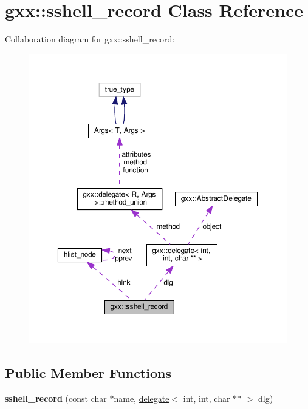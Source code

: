 \hypertarget{classgxx_1_1sshell__record}{}\section{gxx\+:\+:sshell\+\_\+record Class Reference}
\label{classgxx_1_1sshell__record}


Collaboration diagram for gxx\+:\+:sshell\+\_\+record\+:
\nopagebreak
\begin{figure}[H]
\begin{center}
\leavevmode
\includegraphics[width=350pt]{classgxx_1_1sshell__record__coll__graph}
\end{center}
\end{figure}
\subsection*{Public Member Functions}
\begin{DoxyCompactItemize}
\item 
{\bfseries sshell\+\_\+record} (const char $\ast$name, \hyperlink{classgxx_1_1delegate}{delegate}$<$ int, int, char $\ast$$\ast$ $>$ dlg)\hypertarget{classgxx_1_1sshell__record_a8d33f2069f20e8ded1e5581f3b7eb8af}{}\label{classgxx_1_1sshell__record_a8d33f2069f20e8ded1e5581f3b7eb8af}

\end{DoxyCompactItemize}
